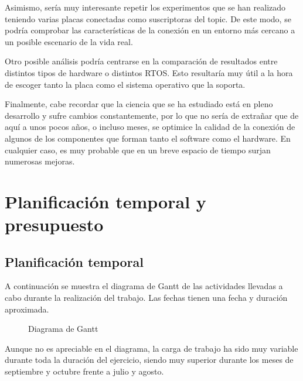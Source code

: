 \documentclass[a4paper,11pt,spanish]{sphinxmanual}
\let\sphinxpxdimen\pdfpxdimen\else\newdimen\sphinxpxdimen
\begin{document}
\sphinxAtStartPar
Asimismo, sería muy interesante repetir los experimentos que se han realizado
teniendo varias placas conectadas como suscriptoras del topic. De este modo,
se podría comprobar las características de la conexión en un entorno más
cercano a un posible escenario de la vida real.

\sphinxAtStartPar
Otro posible análisis podría centrarse en la comparación de resultados entre distintos
tipos de hardware o distintos RTOS. Esto resultaría muy útil a la hora de escoger
tanto la placa como el sistema operativo que la soporta.

\sphinxAtStartPar
Finalmente, cabe recordar que la ciencia que se ha estudiado está en pleno desarrollo
y sufre cambios constantemente, por lo que no sería de extrañar que de aquí a unos
pocos años, o incluso meses, se optimice la calidad de la conexión de algunos
de los componentes que forman tanto el software como el hardware. En cualquier caso, es
muy probable que en un breve espacio de tiempo surjan numerosas mejoras.


\chapter{Planificación temporal y presupuesto}
\label{\detokenize{planificacion_temporal_y_presupuesto:planificacion-temporal-y-presupuesto}}\label{\detokenize{planificacion_temporal_y_presupuesto::doc}}

\section{Planificación temporal}
\label{\detokenize{planificacion_temporal_y_presupuesto:planificacion-temporal}}
\sphinxAtStartPar
A continuación se muestra el diagrama de Gantt de las actividades
llevadas a cabo durante la realización del trabajo. Las fechas
tienen una fecha y duración aproximada.

\begin{figure}[htbp]
\centering
\capstart

\noindent\sphinxincludegraphics[width=600\sphinxpxdimen]{{Diagrama_de_Gantt}.png}
\caption{Diagrama de Gantt}\label{\detokenize{planificacion_temporal_y_presupuesto:id1}}\end{figure}

\sphinxAtStartPar
Aunque no es apreciable en el diagrama, la carga de trabajo ha sido
muy variable durante toda la duración del ejercicio, siendo muy
superior durante los meses de septiembre y octubre frente a
julio y agosto.
\end{document}
